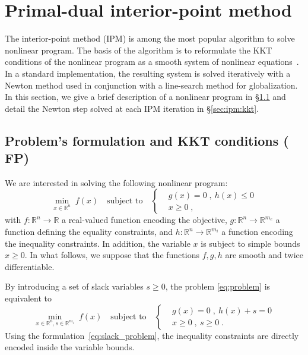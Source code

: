 \section{Primal-dual interior-point method}
The interior-point method (IPM) is among the most popular algorithm
to solve nonlinear program. The basis of the algorithm is to
reformulate the KKT conditions of the nonlinear program as a smooth
system of nonlinear equations~\cite{nocedal_numerical_2006}. In a standard implementation, the
resulting system is solved iteratively with a Newton method used in conjunction
with a line-search method for globalization. In this section, we
give a brief description of a nonlinear program in \S\ref{sec:ipm:problem}
and detail the Newton step solved at each IPM iteration in \S\ref{sec:ipm:kkt}.

\subsection{Problem's formulation and KKT conditions ( FP)}
\label{sec:ipm:problem}
We are interested in solving the following nonlinear program:
\begin{equation}
  \label{eq:problem}
    \min_{x \in \mathbb{R}^n} \;  f(x)
\quad \text{subject to}\quad
\left\{
  \begin{aligned}
    & g(x) = 0 \; , ~ h(x) \leq 0 \\
      & x \geq 0  \; ,
  \end{aligned}
\right.
\end{equation}
with $f:\mathbb{R}^n \to \mathbb{R}$ a real-valued function
encoding the objective, $g: \mathbb{R}^n \to \mathbb{R}^{m_e}$
a function defining the equality constraints, and $h: \mathbb{R}^{n} \to
\mathbb{R}^{m_i}$ a function encoding the inequality constraints.
In addition, the variable $x$ is subject to simple bounds $x \geq 0$.
In what follows, we suppose that the functions $f, g, h$ are smooth
and twice differentiable.

By introducing a set of slack variables $s \geq 0$, the problem
\eqref{eq:problem} is equivalent to
\begin{equation}
  \label{eq:slack_problem}
    \min_{x \in \mathbb{R}^n, s \in \mathbb{R}^{m_i}} \;  f(x)
    \quad \text{subject to} \quad
    \left\{
  \begin{aligned}
    & g(x) = 0 \; , ~ h(x) + s = 0 \\
      & x \geq 0  \; , ~ s \geq 0  \; .
  \end{aligned}
  \right.
\end{equation}
Using the formulation~\eqref{eq:slack_problem}, the inequality constraints
are directly encoded inside the variable bounds.


